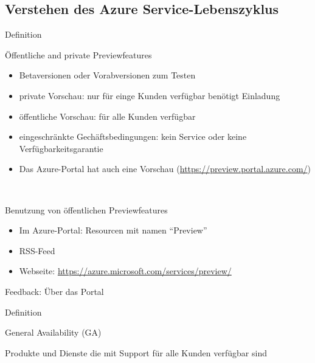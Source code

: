\documentclass{scrartcl}
\newenvironment{flashcard}[2][]{%
    #1
    \vfill
    \centerline{\Large{#2}}
    \vfill
\newpage
}
{\newpage}
\newcommand{\subsectioncard}[1]{
    \vspace*{\stretch{1}}
    \subsection{#1}
    \vspace*{\stretch{1}}
    \pagebreak
}
\begin{document}
    \subsectioncard{Verstehen des Azure Service-Lebenszyklus}

    \begin{flashcard}[Definition]{Öffentliche and private Previewfeatures}
        \begin{itemize}
            \item Betaversionen oder Vorabversionen zum Testen
            \item private Vorschau: nur für einge Kunden verfügbar\newline
            benötigt Einladung
            \item öffentliche Vorschau: für alle Kunden verfügbar
            \item eingeschränkte Gechäftsbedingungen: kein Service oder keine Verfügbarkeitsgarantie
            \item Das Azure-Portal hat auch eine Vorschau\newline
            (\href{https://preview.portal.azure.com/}{https://preview.portal.azure.com/})
        \end{itemize}
    \end{flashcard}

    \begin{flashcard}[\ ]{Benutzung von öffentlichen Previewfeatures}
        \begin{itemize}
            \item Im Azure-Portal: Resourcen mit namen ``Preview''
            \item RSS-Feed
            \item Webseite: \href{https://azure.microsoft.com/services/preview/}{https://azure.microsoft.com/services/preview/}
        \end{itemize}

        \vspace{5mm}
        Feedback: Über das Portal
    \end{flashcard}

    \begin{flashcard}[Definition]{General Availability (GA)}
        Produkte und Dienste die mit Support für alle Kunden verfügbar sind
    \end{flashcard}
\end{document}
